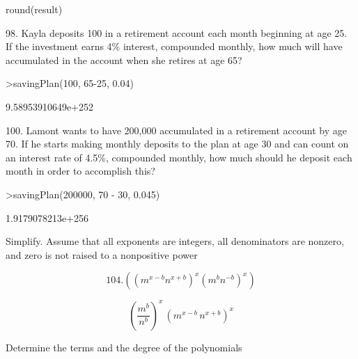 \documentclass[a4paper,10pt]{article}
\begin{document}
\begin{eulernotebook}
\begin{eulercomment}
\begin{eulercomment}
\begin{eulercomment}
\begin{eulercomment}
\begin{eulercomment}
\begin{eulercomment}
\begin{eulercomment}
\begin{eulercomment}
\begin{euleroutput}
                              round(result)
  
\end{euleroutput}
\begin{eulercomment}
98. Kayla deposits \textdollar{}100 in a retirement account each month beginning
at age 25. If the investment earns 4\% interest, compounded monthly,
how much will have accumulated in the account when she retires at age
65?
\end{eulercomment}
\begin{eulerprompt}
>savingPlan(100, 65-25, 0.04)
\end{eulerprompt}
\begin{euleroutput}
  9.58953910649e+252
\end{euleroutput}
\begin{eulercomment}
100. Lamont wants to have \textdollar{}200,000 accumulated in a retirement account
by age 70. If he starts making monthly deposits to the plan at age 30
and can count on an interest rate of 4.5\%, compounded monthly, how
much should he deposit each month in order to accomplish this?
\end{eulercomment}
\begin{eulerprompt}
>savingPlan(200000, 70 - 30, 0.045)
\end{eulerprompt}
\begin{euleroutput}
  1.9179078213e+256
\end{euleroutput}
\begin{eulercomment}
Simplify. Assume that all exponents are integers, all denominators are
nonzero, and zero is not raised to a nonpositive power

\end{eulercomment}
\begin{eulerformula}
\[
104. \left((m^{x-b}n^{x+b})^{x}(m^{b}n^{-b})^{x}\right)
\]
\end{eulerformula}
\begin{eulerformula}
\[
\left(\frac{m^{b}}{n^{b}}\right)^{x}\,\left(m^{x-b}\,n^{x+b}\right)  ^{x}
\]
\end{eulerformula}
\begin{eulercomment}
Determine the terms and the degree of the polynomials


\end{eulercomment}
\end{eulercomment}
\end{eulercomment}
\end{eulercomment}
\end{eulercomment}
\end{eulercomment}
\end{eulercomment}
\end{eulercomment}
\end{eulercomment}
\end{eulernotebook}
\end{document}
